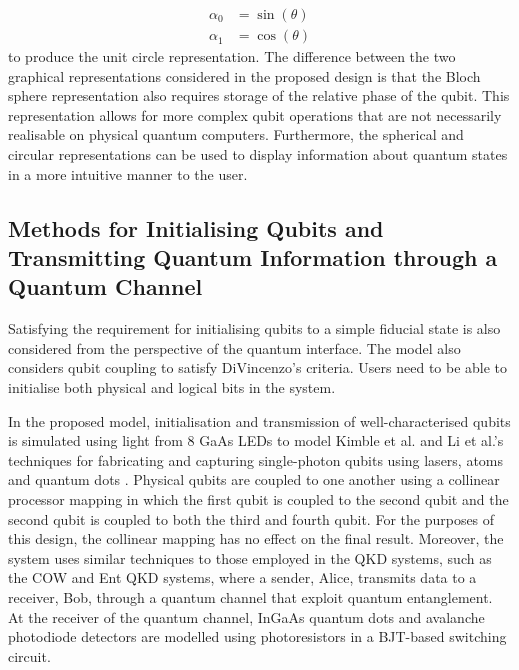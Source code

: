 \begin{align}\label{eqn:amplitude-sinusoids}
	\alpha_0	& = \sin(\theta)\\
	\alpha_1    & = \cos(\theta)
\end{align}
to produce the unit circle representation. The difference between the two graphical representations considered in the proposed design is that the Bloch sphere representation also requires storage of the relative phase of the qubit. This representation allows for more complex qubit operations that are not necessarily realisable on physical quantum computers. Furthermore, the spherical and circular representations can be used to display information about quantum states in a more intuitive manner to the user. 

\subsection{Methods for Initialising Qubits and Transmitting Quantum Information through a Quantum Channel \label{subsec:req-sim-gates}}

Satisfying the requirement for initialising qubits to a simple fiducial state is also considered from the perspective of the quantum interface. The model also considers qubit coupling to satisfy DiVincenzo's criteria. Users need to be able to initialise both physical and logical bits in the system.

In the proposed model, initialisation and transmission of well-characterised qubits is simulated using light from 8 GaAs LEDs to model Kimble et al. and Li et al.'s techniques for fabricating and capturing single-photon qubits using lasers, atoms and quantum dots \cite{turchette1995measurement, li2022control}. Physical qubits are coupled to one another using a collinear processor mapping in which the first qubit is coupled to the second qubit and the second qubit is coupled to both the third and fourth qubit. For the purposes of this design, the collinear mapping has no effect on the final result. Moreover, the system uses similar techniques to those employed in the QKD systems, such as the COW and Ent QKD systems, where a sender, Alice, transmits data to a receiver, Bob, through a quantum channel that exploit quantum entanglement. At the receiver of the quantum channel, InGaAs quantum dots and avalanche photodiode detectors are modelled using photoresistors in a BJT-based switching circuit. 


